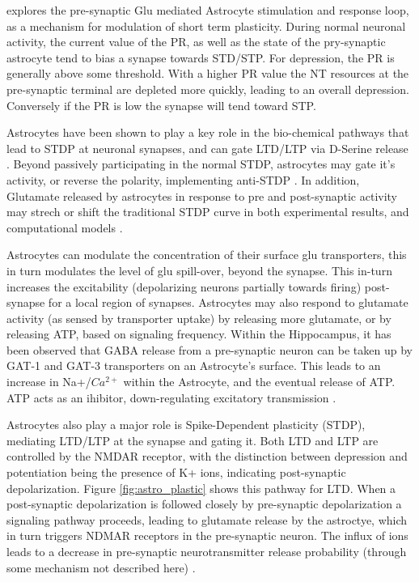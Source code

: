     
    \cite{pitta_2012} explores the pre-synaptic Glu mediated Astrocyte
    stimulation and response loop, as a mechanism for modulation of short term
    plasticity. During normal neuronal activity, the current value of the PR, as
    well as the state of the pry-synaptic astrocyte tend to bias a synapse
    towards STD/STP. For depression, the PR is generally above some
    threshold. With a higher PR value the NT resources at the pre-synaptic
    terminal are depleted more quickly, leading to an overall
    depression. Conversely if the PR is low the synapse will tend toward
    STP.

    Astrocytes have been shown to play a key role in the bio-chemical pathways
    that lead to STDP at neuronal synapses, and can gate LTD/LTP via D-Serine
    release \cite{manninen_2019}. Beyond passively participating in the normal
    STDP, astrocytes may gate it's activity, or reverse the polarity,
    implementing anti-STDP \cite{min_2012}. In addition, Glutamate released by
    astrocytes in response to pre and post-synaptic activity may strech or shift
    the traditional STDP curve in both experimental results, and computational
    models \cite{pitta_2016}.

    Astrocytes can modulate the concentration of their surface glu transporters,
    this in turn modulates the level of glu spill-over, beyond the synapse. This
    in-turn increases the excitability (depolarizing neurons partially towards
    firing) post-synapse for a local region of synapses. Astrocytes may also
    respond to glutamate activity (as sensed by transporter uptake) by releasing
    more glutamate, or by releasing ATP, based on signaling frequency. Within
    the Hippocampus, it has been observed that GABA release from a pre-synaptic
    neuron can be taken up by GAT-1 and GAT-3 transporters on an Astrocyte's
    surface. This leads to an increase in Na+/$Ca^{2+}$ within the Astrocyte,
    and the eventual release of ATP. ATP acts as an ihibitor, down-regulating
    excitatory transmission \cite{mederos_2018}.
    
    Astrocytes also play a major role is Spike-Dependent plasticity (STDP), mediating
    LTD/LTP at the synapse and gating it. Both LTD and LTP are controlled by the
    NMDAR receptor, with the distinction between depression and potentiation
    being the presence of K+ ions, indicating post-synaptic
    depolarization. Figure \ref{fig:astro_plastic} shows this pathway for
    LTD. When a post-synaptic depolarization is followed closely by pre-synaptic
    depolarization a signaling pathway proceeds, leading to glutamate release by
    the astroctye, which in turn triggers NDMAR receptors in the pre-synaptic
    neuron. The influx of ions leads to a decrease in pre-synaptic
    neurotransmitter release probability (through some mechanism not described
    here) \cite{min_2012}.
        
